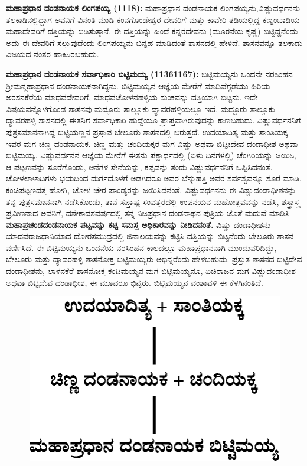 \textbf{ಮಹಾಪ್ರಧಾನ ದಂಡನಾಯಕ ಲಿಂಗಪಯ್ಯ (1118):} ಮಹಾಪ್ರಧಾನ ದಂಡನಾಯಕ ಲಿಂಗಪಯ್ಯನು,\break ವಿಷ್ಣುವರ್ಧನನು ತಲಕಾಡಿನಲ್ಲಿದ್ದಾಗ ಅವನಿಗೆ ವಿನಂತಿ ಮಾಡಿ ಕಂನಗೊಂಡೇಶ್ವರ ದೇವರಿಗೆ ಮತ್ತು ಕಾವೇರಿ ತಡಿಯಲ್ಲಿದ್ದ ಕಣ್ನಂಬಾಡಿಯ ಮಹಾದೇವರಿಗೆ ದತ್ತಿಯನ್ನು ಬಿಡಿಸುತ್ತಾನೆ. ಈ ದತ್ತಿಯನ್ನು ಹಿಂದೆ ಕನ್ನರದೇವನು (ಮೂರನೆಯ ಕೃಷ್ಣ) ಬಿಟ್ಟಿದ್ದನೆಂದು ಅದು ಈ ದೇವರಿಗೆ ಸಲ್ಲುವುದೆಂದು ಲಿಂಗಪಯ್ಯನು ಬಿನ್ನಹ ಮಾಡಿದಂತೆ ಶಾಸನದಲ್ಲಿ ಹೇಳಿದೆ. ಶಾಸನವನ್ನೂ ತಲಕಾಡು ವಿಜಯದ ನಂತರ ಹಾಕಿಸಿರಬಹುದು.

\textbf{ಮಹಾಪ್ರಧಾನ ದಂಡನಾಯಕ ಸರ್ವಾಧಿಕಾರಿ ಬಿಟ್ಟಿಮಯ್ಯ (1136\general{\enginline{-}}1167):} ಬಿಟ್ಟಿಮಯ್ಯನು ಒಂದನೇ ನರಸಿಂಹನ ಶ‍್ರೀಮನ್ಮಹಾಪ್ರಧಾನ ದಂಡನಾಯಕನಾಗಿದ್ದನು. ಬಿಟ್ಟಿಮಯ್ಯನ ಆಜ್ಞೆಯ ಮೇರೆಗೆ ಮಾದಿವೆಗ್ಗಡೆಯು ಹಿರಿಯ ಅರಸನಕೆರೆಯ ಮಾಧವದೇವರಿಗೆ, ಮಾಧವಚೋಳನಹಳ್ಳಿಯ ಸುಂಕವನ್ನು ದತ್ತಿಯಾಗಿ ಬಿಟ್ಟನು. ಇದೇ ವಿಷಯವನ್ನೊಳಗೊಂಡ ಶಾಸನವು ಮದ್ದೂರು ತಾಲ್ಲೂಕು ದ್ಯಾವರಹಳ್ಳಿಯಲ್ಲೂ ಇದೆ. ಮದ್ದೂರು ತಾಲ್ಲೂಕು ದ್ಯಾವರಹಳ್ಳಿ ಶಾಸನದಲ್ಲಿ ಈತನಿಗೆ ಸರ್ವಾಧಿಕಾರಿ ಹುದ್ದೆಯೂ ಪ್ರಾಪ್ತವಾಗಿರುವುದನ್ನು ಕಾಣಬಹುದು. ವಿಷ್ಣುವರ್ಧನನಿಗೆ ಪುತ್ರಸಮಾನನಾಗಿದ್ದ ಬಿಟ್ಟಿಯಣ್ಣನ ಪ್ರಸ್ತಾಪ ಬೇಲೂರು ಶಾಸನದಲ್ಲಿ ಬರುತ್ತದೆ. ಉದಯಾದಿತ್ಯ ಮತ್ತು ಸಾಂತಿಯಕ್ಕ ಇವರ ಮಗ ಚಿಣ್ಣ ದಂಡನಾಯಕ. ಚಿಣ್ಣ ಮತ್ತು ಚಂದಿಯಕ್ಕರ ಮಗ ವಿಷ್ಣು ಅಥವಾ ಬಿಟ್ಟೀದೇವ ದಂಡಾಧೀಶ ಅಥವಾ ಬಿಟ್ಟಿಮಯ್ಯ. ವಿಷ್ಣುವರ್ಧನನ ಆಜ್ಞೆಯ ಮೇರೆಗೆ ಈತನು ಪಕ್ಷಾರ್ಧದಲ್ಲಿ (ಏಳು ದಿನಗಳಲ್ಲಿ) ಚೆಂಗಿರಿಯನ್ನು ಜಯಿಸಿ, ಆ ಪಟ್ಟಣವನ್ನು ಸೂರೆಗೊಂಡು, ಆನೆಗಳ ಸೇನೆಯನ್ನು, ಕಪ್ಪವನ್ನು ತಂದು ವಿಷ್ಣುವರ್ಧನನಿಗೆ ಒಪ್ಪಿಸಿದನಂತೆ. ಚೋಳಲಾಳಾದಿಗಳು ಭಯದಿಂದ ದುರ್ಗದೊಳಗೆ ಅಡಗಿದರೂ ಅವರ ಬೆನ್ನುಹತ್ತಿ ಅವರ ಸರ್ವಸ್ವವನ್ನೂ ಸೂರೆ ಮಾಡಿ, ಕಂಚಿಪಟ್ಟಣದತ್ತ ಹೋಗಿ, ಚೋಳ ಚೇರ ಪಾಂಡ್ಯರನ್ನು ಜಯಿಸಿದನಂತೆ. ವಿಷ್ಣುವರ್ಧನನು ಈ ವಿಷ್ಣುದಂಡಾಧೀಶನನ್ನು ತನ್ನ ಪುತ್ರಸಮಾನನಾಗಿ ನಡೆಸಿಕೊಂಡು, ತಾನೆ ಸಪ್ತಾಷ್ಟ ಸಂವತ್ಸರದಲ್ಲಿ ಉಪನಯನ ಮಹೋತ್ಸವವನ್ನು ನಡೆಸಿ, ಶಸ್ತ್ರಾಸ್ತ್ರ ಪ್ರವೀಣನಾದ ಅವನಿಗೆ, ದಶೇಕಾದಶವರ್ಷದಲ್ಲಿ ತನ್ನ ನಿಜಪ್ರಧಾನ ದಂಡನಾಥನ ಪುತ್ರಿಯ ಜೊತೆ ಮದುವೆ ಮಾಡಿಸಿ \textbf{ಮಹಾಪ್ರಚಂಡದಂಡನಾಯಕ ಪಟ್ಟವನ್ನು ಕಟ್ಟಿ ಸಮಸ್ತ ಅಧಿಕಾರವನ್ನು ನೀಡಿದನಂತೆ.} ವಿಷ್ಣು ದಂಡಾಧೀಶನು ಯಾದವರಾಜಧಾನಿಯಾದ ದೋರಸಮುದ್ರದಲ್ಲಿ ಜಿನಾಲಯವನ್ನು ಕಟ್ಟಿಸಿ ದತ್ತಿಯನ್ನು ಬಿಟ್ಟನೆಂದು ಬೇಲೂರು ಶಾಸನ ವರ್ಣಿಸಿದೆ. ಈ ಬಿಟ್ಟಿಮಯ್ಯನು ಒಂದನೆಯ ನರಸಿಂಹನ ಕಾಲದಲ್ಲೂ ಮಹಾಪ್ರಧಾನನಾಗಿ ಮುಂದುವರಿದಿದ್ದು, ಬೇಲೂರು ಮತ್ತು ದ್ಯಾವರಹಳ್ಳಿ ಶಾಸನೋಕ್ತ ಬಿಟ್ಟಿಮಯ್ಯರು ಅಭಿನ್ನರೆಂದು ಹೇಳಬಹುದು. ಪ್ರಸ್ತುತ ಶಾಸನದ ಬಿಟ್ಟಿದೇವ ದಂಡಾಧೀಶನು, ಲಾಳನಕೆರೆ ಶಾಸನೋಕ್ತ ಕಂಟಿಮಯ್ಯನ ಮಗ ಬಿಟ್ಟಿಮಯ್ಯನೂ, ಏಚಿರಾಜನ ಮಗ ವಿಷ್ಣುದಂಡಾಧೀಶ ಅಥವಾ ಬಿಟ್ಟಿದೇವ ದಂಡಾಧೀಶ, ಈ ಮೂವರೂ ಭಿನ್ನರು. ಬಿಟ್ಟಿಮಯ್ಯನ ವಂಶಾವಳಿ ಈ ಕೆಳಗಿನಂತಿದೆ.

\begin{figure}[!h]
\includegraphics[scale=1.25]{images/chap3/chap3fig17.jpeg}
\end{figure}

